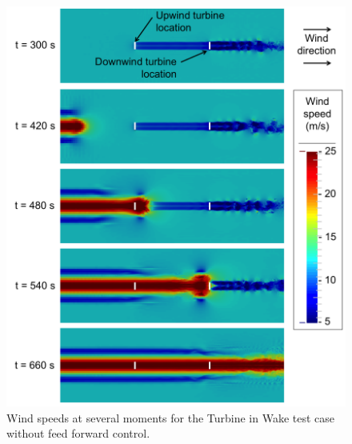  \begin{figure}[!htbp] 
	\centering
		\includegraphics[width = \linewidth]{Figures/ch6Figures/fig6-27.png}

	\caption{Wind speeds at several moments for the Turbine in Wake test case without feed forward control.}
	\label{fig6-27} 
\end{figure}


